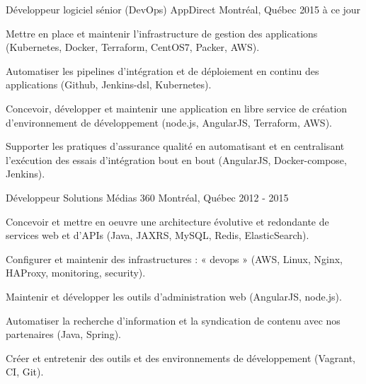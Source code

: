 
\begin{cventries}

  \cventry
    {Développeur logiciel sénior (DevOps)} %
    {AppDirect} %
    {Montréal, Québec} %
    {2015 à ce jour} %
    {
      \begin{cvitems} %
        \item {Mettre en place et maintenir l'infrastructure de gestion des applications (Kubernetes, Docker, Terraform, CentOS7, Packer, AWS).}
        \item {Automatiser les pipelines d'intégration et de déploiement en continu des applications (Github, Jenkins-dsl, Kubernetes).}
        \item {Concevoir, développer et maintenir une application en libre service de création d'environnement de développement (node.js, AngularJS, Terraform, AWS).}
        \item {Supporter les pratiques d'assurance qualité en automatisant et en centralisant l'exécution des essais d'intégration bout en bout (AngularJS, Docker-compose, Jenkins).}
      \end{cvitems}
    }

  \cventry
    {Développeur} %
    {Solutions Médias 360} %
    {Montréal, Québec} %
    {2012 - 2015} %
    {
      \begin{cvitems} %
        \item {Concevoir et mettre en oeuvre une architecture évolutive et redondante de services web et d’APIs (Java, JAXRS, MySQL, Redis, ElasticSearch).}
        \item {Configurer et maintenir des infrastructures : « devops » (AWS, Linux, Nginx, HAProxy, monitoring, security).}
        \item {Maintenir et développer les outils d’administration web (AngularJS, node.js).}
        \item {Automatiser la recherche d'information et la syndication de contenu avec nos partenaires (Java, Spring).}
        \item {Créer et entretenir des outils et des environnements de développement (Vagrant, CI, Git).}
      \end{cvitems}
    }


\end{cventries}
